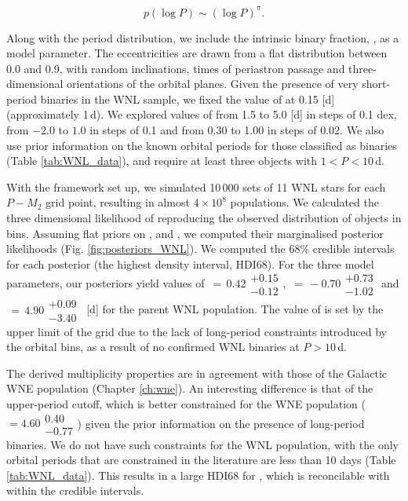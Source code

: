 \begin{equation}
    p(\log P) \sim (\log P)^{\pi}.
\end{equation}

Along with the period distribution, we include the intrinsic binary fraction, \fintWNL{}, as a model parameter. The eccentricities are drawn from a flat distribution between 0.0 and 0.9, with random inclinations, times of periastron passage and three-dimensional orientations of the orbital planes. Given the presence of very short-period binaries in the WNL sample, we fixed the value of \logPminWNL{} at 0.15 [d] (approximately 1\,d). We explored values of \logPmaxWNL{} from 1.5 to 5.0 [d] in steps of 0.1 dex, \piWNL{} from $-2.0$ to $1.0$ in steps of 0.1 and \fintWNL{} from 0.30 to 1.00 in steps of 0.02. We also use prior information on the known orbital periods for those classified as binaries (Table \ref{tab:WNL_data}), and require at least three objects with $1<P<10\,$d.

With the framework set up, we simulated 10\,000 sets of 11 WNL stars for each $P-M_2$ grid point, resulting in almost $4 \times 10^8$ populations. We calculated the three dimensional likelihood of reproducing the observed distribution of objects in \DelRV{} bins. Assuming flat priors on \logPmaxWNL{}, \piWNL{} and \fintWNL{}, we computed their marginalised posterior likelihoods (Fig. \ref{fig:posteriors_WNL}). We computed the 68\% credible intervals for each posterior (the highest density interval, HDI68). For the three model parameters, our posteriors yield values of \fintWNL{}$\,=\,0.42\substack{+0.15 \\ -0.12}$, \piWNL{}$\,=\,-0.70\substack{+0.73 \\ -1.02}$ and \logPmaxWNL$\,=\,4.90\substack{+0.09 \\ -3.40}\,$ [d] for the parent WNL population. The value of \logPmaxWNL{} is set by the upper limit of the grid due to the lack of long-period constraints introduced by the orbital bins, as a result of no confirmed WNL binaries at $P>10\,$d.

The derived multiplicity properties are in agreement with those of the Galactic WNE population (Chapter \ref{ch:wne}). An interesting difference is that of the upper-period cutoff, which is better constrained for the WNE population (\logPmaxWNE{}\,$= 4.60\substack{0.40 \\ -0.77}$) given the prior information on the presence of long-period binaries. We do not have such constraints for the WNL population, with the only orbital periods that are constrained in the literature are less than 10 days (Table \ref{tab:WNL_data}). This results in a large HDI68 for \logPmaxWNL{}, which is reconcilable with \logPmaxWNE{} within the credible intervals.

